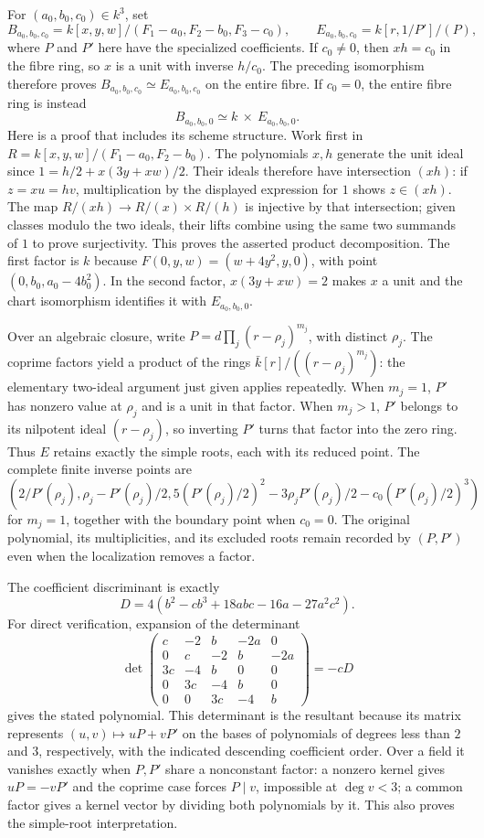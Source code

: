 For $(a_0,b_0,c_0)\in k^3$, set
\[
 B_{a_0,b_0,c_0}=k[x,y,w]/(F_1-a_0,F_2-b_0,F_3-c_0),
 \qquad E_{a_0,b_0,c_0}=k[r,1/P']/(P),
\]
where $P$ and $P'$ here have the specialized coefficients.
If $c_0\ne0$, then $xh=c_0$ in the fibre ring, so $x$ is a unit
with inverse $h/c_0$. The preceding isomorphism therefore proves
$B_{a_0,b_0,c_0}\simeq E_{a_0,b_0,c_0}$ on the entire fibre.
If $c_0=0$, the entire fibre ring is instead
\[
 B_{a_0,b_0,0}\simeq k\ \times\ E_{a_0,b_0,0}.
\]
Here is a proof that includes its scheme structure. Work first in
$R=k[x,y,w]/(F_1-a_0,F_2-b_0)$. The polynomials $x,h$ generate the
unit ideal since
$1=h/2+x(3y+xw)/2$. Their ideals therefore have intersection $(xh)$:
if $z=xu=hv$, multiplication by the displayed expression for $1$
shows $z\in(xh)$. The map
$R/(xh)\to R/(x)\times R/(h)$ is injective by that intersection;
given classes modulo the two ideals, their lifts combine using the
same two summands of $1$ to prove surjectivity. This proves the asserted
product decomposition. The first factor is $k$ because
$F(0,y,w)=(w+4y^2,y,0)$, with point $(0,b_0,a_0-4b_0^2)$.
In the second factor, $x(3y+xw)=2$ makes $x$ a unit and the chart
isomorphism identifies it with $E_{a_0,b_0,0}$.

Over an algebraic closure, write $P=d\prod_j(r-\rho_j)^{m_j}$,
with distinct $\rho_j$. The coprime factors yield a product of the
rings $\bar k[r]/((r-\rho_j)^{m_j})$: the elementary two-ideal
argument just given applies repeatedly. When $m_j=1$, $P'$ has
nonzero value at $\rho_j$ and is a unit in that factor. When $m_j>1$,
$P'$ belongs to its nilpotent ideal $(r-\rho_j)$, so inverting $P'$
turns that factor into the zero ring. Thus $E$ retains exactly the
simple roots, each with its reduced point. The complete finite inverse
points are
\[
 \left(2/P'(\rho_j),\rho_j-P'(\rho_j)/2,
 5(P'(\rho_j)/2)^2-3\rho_jP'(\rho_j)/2-c_0(P'(\rho_j)/2)^3\right)
\]
for $m_j=1$, together with the boundary point when $c_0=0$.
The original polynomial, its multiplicities, and its excluded roots
remain recorded by $(P,P')$ even when the localization removes a factor.

The coefficient discriminant is exactly
\[
 D=4(b^2-cb^3+18abc-16a-27a^2c^2).
\]
For direct verification, expansion of the determinant
\[
 \det\begin{pmatrix}
 c&-2&b&-2a&0\\0&c&-2&b&-2a\\
 3c&-4&b&0&0\\0&3c&-4&b&0\\0&0&3c&-4&b
 \end{pmatrix}=-cD
\]
gives the stated polynomial. This determinant is the resultant because
its matrix represents $(u,v)\mapsto uP+vP'$ on the bases of
polynomials of degrees less than $2$ and $3$, respectively, with the
indicated descending coefficient order. Over a field it vanishes
exactly when $P,P'$ share a nonconstant factor: a nonzero kernel gives
$uP=-vP'$ and the coprime case forces $P\mid v$, impossible at
$\deg v<3$; a common factor gives a kernel vector by dividing both
polynomials by it. This also proves the simple-root interpretation.


